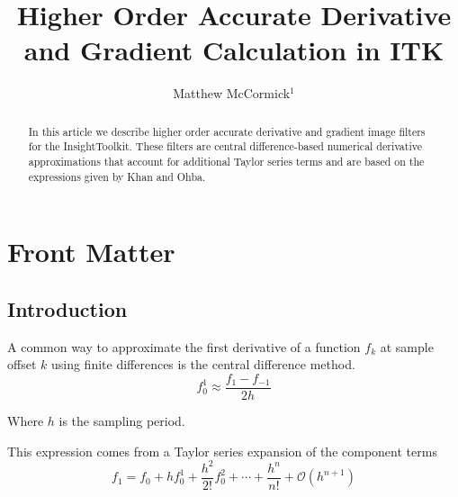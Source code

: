 \documentclass{InsightArticle}
\title{Higher Order Accurate Derivative and Gradient Calculation in ITK}
\author{Matthew McCormick$^{1}$}
\newcommand{\IJhandlerIDnumber}{3231}
\begin{document}
%
%
\IJhandlefooter{\IJhandlerIDnumber}


\ifpdf
\else
\fi


\maketitle


\ifhtml
\chapter*{Front Matter\label{front}}
\fi


\begin{abstract}
\noindent In this article we describe higher order accurate derivative and gradient
image filters for the InsightToolkit.  These filters are central difference-based
numerical derivative approximations that account for additional Taylor
series terms and are based on the expressions given by Khan and Ohba.
\end{abstract}

\IJhandlenote{\IJhandlerIDnumber}

\tableofcontents

\section{Introduction}

A common way to approximate the first derivative of a function $f_k$ at sample offset $k$ using
finite differences is the central difference method.
\begin{equation}
  f^1_0  \approx \frac{f_1 - f_{-1}} { 2 h }
\end{equation}

Where $h$ is the sampling period.

This expression comes from a Taylor series expansion of the component terms
\begin{equation}
  f_1 = f_0 + h f^1_0 + \frac{h^2}{2!}f^2_0 + \cdots + \frac{h^n}{n!} +
  \mathcal{O}(h^{n+1})
\end{equation}
\end{document}

